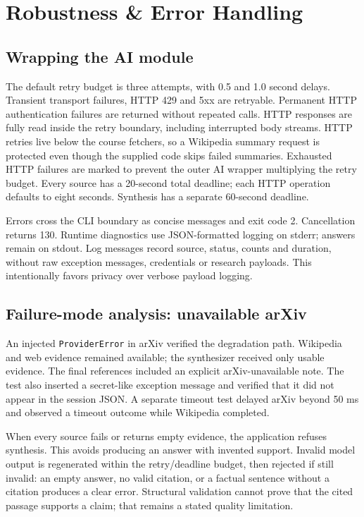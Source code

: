 \documentclass[11pt,a4paper]{article}
\begin{document}
\clearpage
\section{Robustness \& Error Handling}
\subsection{Wrapping the AI module}
The default retry budget is three attempts, with 0.5 and 1.0 second delays. Transient transport failures, HTTP 429 and 5xx are retryable. Permanent HTTP authentication failures are returned without repeated calls. HTTP responses are fully read inside the retry boundary, including interrupted body streams. HTTP retries live below the course fetchers, so a Wikipedia summary request is protected even though the supplied code skips failed summaries. Exhausted HTTP failures are marked to prevent the outer AI wrapper multiplying the retry budget. Every source has a 20-second total deadline; each HTTP operation defaults to eight seconds. Synthesis has a separate 60-second deadline.

Errors cross the CLI boundary as concise messages and exit code 2. Cancellation returns 130. Runtime diagnostics use JSON-formatted logging on stderr; answers remain on stdout. Log messages record source, status, counts and duration, without raw exception messages, credentials or research payloads. This intentionally favors privacy over verbose payload logging.

\subsection{Failure-mode analysis: unavailable arXiv}
An injected \texttt{ProviderError} in arXiv verified the degradation path. Wikipedia and web evidence remained available; the synthesizer received only usable evidence. The final references included an explicit arXiv-unavailable note. The test also inserted a secret-like exception message and verified that it did not appear in the session JSON. A separate timeout test delayed arXiv beyond 50 ms and observed a timeout outcome while Wikipedia completed.

When every source fails or returns empty evidence, the application refuses synthesis. This avoids producing an answer with invented support. Invalid model output is regenerated within the retry/deadline budget, then rejected if still invalid: an empty answer, no valid citation, or a factual sentence without a citation produces a clear error. Structural validation cannot prove that the cited passage supports a claim; that remains a stated quality limitation.
\end{document}
